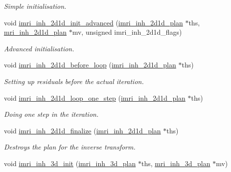 \begin{CompactItemize}
\begin{CompactList}\small\item\em Simple initialisation. \item\end{CompactList}\item 
\hypertarget{group__solver_ga21}{
void \hyperlink{group__solver_ga21}{imri\_\-inh\_\-2d1d\_\-init\_\-advanced} (\hyperlink{structimri__inh__2d1d__plan}{imri\_\-inh\_\-2d1d\_\-plan} $\ast$ths, \hyperlink{structmri__inh__2d1d__plan}{mri\_\-inh\_\-2d1d\_\-plan} $\ast$mv, unsigned imri\_\-inh\_\-2d1d\_\-flags)}
\label{group__solver_ga21}

\begin{CompactList}\small\item\em Advanced initialisation. \item\end{CompactList}\item 
\hypertarget{group__solver_ga22}{
void \hyperlink{group__solver_ga22}{imri\_\-inh\_\-2d1d\_\-before\_\-loop} (\hyperlink{structimri__inh__2d1d__plan}{imri\_\-inh\_\-2d1d\_\-plan} $\ast$ths)}
\label{group__solver_ga22}

\begin{CompactList}\small\item\em Setting up residuals before the actual iteration. \item\end{CompactList}\item 
\hypertarget{group__solver_ga23}{
void \hyperlink{group__solver_ga23}{imri\_\-inh\_\-2d1d\_\-loop\_\-one\_\-step} (\hyperlink{structimri__inh__2d1d__plan}{imri\_\-inh\_\-2d1d\_\-plan} $\ast$ths)}
\label{group__solver_ga23}

\begin{CompactList}\small\item\em Doing one step in the iteration. \item\end{CompactList}\item 
\hypertarget{group__solver_ga24}{
void \hyperlink{group__solver_ga24}{imri\_\-inh\_\-2d1d\_\-finalize} (\hyperlink{structimri__inh__2d1d__plan}{imri\_\-inh\_\-2d1d\_\-plan} $\ast$ths)}
\label{group__solver_ga24}

\begin{CompactList}\small\item\em Destroys the plan for the inverse transform. \item\end{CompactList}\item 
\hypertarget{group__solver_ga25}{
void \hyperlink{group__solver_ga25}{imri\_\-inh\_\-3d\_\-init} (\hyperlink{structimri__inh__3d__plan}{imri\_\-inh\_\-3d\_\-plan} $\ast$ths, \hyperlink{structmri__inh__3d__plan}{mri\_\-inh\_\-3d\_\-plan} $\ast$mv)}
\label{group__solver_ga25}


\end{CompactItemize}
